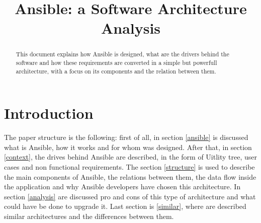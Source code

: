 \documentclass[conference]{IEEEtran}
\begin{document}
\title{Ansible: a Software Architecture Analysis}

\author{
}

\maketitle

\begin{abstract}
This document explains how Ansible is designed, what are the drivers behind the software and how these requirements are converted in a simple but powerfull architecture, with a focus on its components and the relation between them. 
\end{abstract}

\section*{Introduction}
The paper structure is the following: first of all, in section \ref{ansible} is discussed what is Ansible, how it works and for whom was designed. After that, in section \ref{context}, the drives behind Ansible are described, in the form of Uitlity tree, user cases and non functional requirements. The section \ref{structure} is used to describe the main components of Ansible, the relations between them, the data flow inside the application and why Ansible developers have chosen this architecture. In section \ref{analysis} are discussed pro and cons of this type of architecture and what could have be done to upgrade it. Last section is \ref{similar}, where are described similar architectures and the differences between them.
\end{document}
